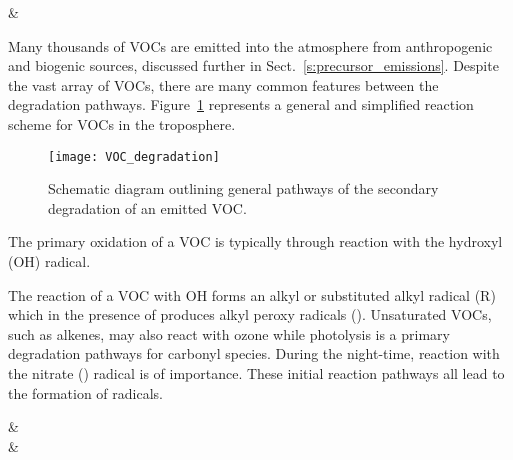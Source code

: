 \begin{rxnarray}
     & \rightarrow {} \label{r:NO_O3}
\end{rxnarray}

Many thousands of VOCs are emitted into the atmosphere from anthropogenic and biogenic sources, discussed further in Sect.~\ref{s:precursor_emissions}. 
Despite the vast array of VOCs, there are many common features between the degradation pathways.
Figure~\ref{f:VOC_reaction} represents a general and simplified reaction scheme for VOCs in the troposphere. 
\begin{figure}[t]
    \begin{center}
        \caption[Schematic of general secondary degradation of VOCs]{Schematic diagram outlining general pathways of the secondary degradation of an emitted VOC.}
        \texttt{[image: VOC\_degradation]}
        \label{f:VOC_reaction}
    \end{center}
\end{figure}

The primary oxidation of a VOC is typically through reaction with the hydroxyl (OH) radical.

The reaction of a VOC with OH forms an alkyl or substituted alkyl radical (R) which in the presence of  produces alkyl peroxy radicals ().
Unsaturated VOCs, such as alkenes, may also react with ozone while photolysis is a primary degradation pathways for carbonyl species.
During the night-time, reaction with the nitrate () radical is of importance.
These initial reaction pathways all lead to the formation of  radicals.
\begin{rxnarray}
     & \rightarrow {} \label{r:VOC_init} \\
     & \rightarrow {} \label{r:R_O2}
\end{rxnarray} 

